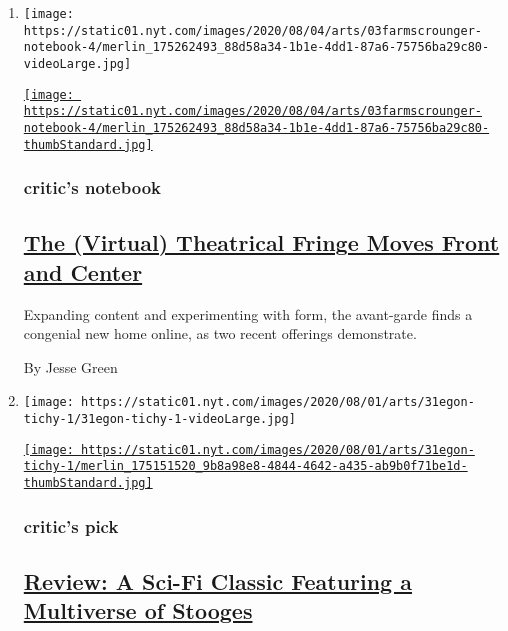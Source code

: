 \begin{enumerate}
\def\labelenumi{\arabic{enumi}.}
\item
  \texttt{[image: https://static01.nyt.com/images/2020/08/04/arts/03farmscrounger-notebook-4/merlin\_175262493\_88d58a34-1b1e-4dd1-87a6-75756ba29c80-videoLarge.jpg]}

  \href{/2020/08/03/theater/virtual-theater.html}{\texttt{[image: https://static01.nyt.com/images/2020/08/04/arts/03farmscrounger-notebook-4/merlin\_175262493\_88d58a34-1b1e-4dd1-87a6-75756ba29c80-thumbStandard.jpg]}}

  \hypertarget{critics-notebook}{%
  \subsubsection{critic's notebook}\label{critics-notebook}}

  \hypertarget{the-virtual-theatrical-fringe-moves-front-and-center}{%
  \subsection{\texorpdfstring{\href{/2020/08/03/theater/virtual-theater.html}{The
  (Virtual) Theatrical Fringe Moves Front and
  Center}}{The (Virtual) Theatrical Fringe Moves Front and Center}}\label{the-virtual-theatrical-fringe-moves-front-and-center}}

  Expanding content and experimenting with form, the avant-garde finds a
  congenial new home online, as two recent offerings demonstrate.

  By Jesse Green
\item
  \texttt{[image: https://static01.nyt.com/images/2020/08/01/arts/31egon-tichy-1/31egon-tichy-1-videoLarge.jpg]}

  \href{/2020/07/31/theater/the-7th-voyage-of-egon-tichy-review.html}{\texttt{[image: https://static01.nyt.com/images/2020/08/01/arts/31egon-tichy-1/merlin\_175151520\_9b8a98e8-4844-4642-a435-ab9b0f71be1d-thumbStandard.jpg]}}

  \hypertarget{critics-pick}{%
  \subsubsection{critic's pick}\label{critics-pick}}

  \hypertarget{review-a-sci-fi-classic-featuring-a-multiverse-of-stooges}{%
  \subsection{\texorpdfstring{\href{/2020/07/31/theater/the-7th-voyage-of-egon-tichy-review.html}{Review:
  A Sci-Fi Classic Featuring a Multiverse of
  Stooges}}{Review: A Sci-Fi Classic Featuring a Multiverse of Stooges}}\label{review-a-sci-fi-classic-featuring-a-multiverse-of-stooges}}


\end{enumerate}
